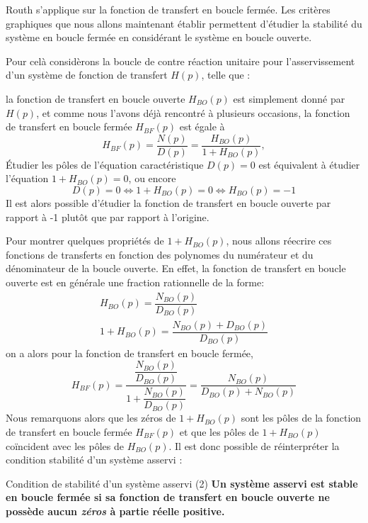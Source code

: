 Routh s'applique sur la fonction de transfert en boucle fermée. 
Les critères graphiques que nous allons maintenant établir 
permettent d'étudier la stabilité du système en boucle fermée en considérant 
le système en boucle ouverte.

Pour celà considèrons la boucle de contre réaction unitaire 
pour l'asservissement d'un système de fonction de transfert $H(p)$, telle que :
\begin{center}
    
\end{center}

la fonction de transfert en boucle ouverte $H_{BO}(p)$ est simplement donné 
par $H(p)$, et comme nous l'avons déjà rencontré à plusieurs occasions, la 
fonction de transfert en boucle fermée $H_{BF}(p)$ est égale à 
$$
H_{BF}(p)=\dfrac{N(p)}{D(p)}=\dfrac{H_{BO}(p)}{1+H_{BO}(p)},
$$
\'Etudier les pôles de l'équation caractéristique $D(p)=0$ est équivalent 
à étudier l'équation $1+H_{BO}(p)=0$, ou encore 
$$
D(p)=0\Leftrightarrow1+H_{BO}(p)=0\Leftrightarrow H_{BO}(p)=-1
$$
Il est alors possible d'étudier la fonction de transfert en boucle ouverte par 
rapport à -1 plutôt que par rapport à l'origine. 

Pour montrer quelques propriétés de $1+H_{BO}(p)$, nous allons réecrire
ces fonctions de transferts en fonction des polynomes du numérateur et
du dénominateur de la boucle ouverte.
En effet, la fonction de transfert en boucle ouverte
est en générale une fraction rationnelle de la forme:
\begin{align*}
H_{BO}(p)=\dfrac{N_{BO}(p)}{D_{BO}(p)} \\
1+H_{BO}(p)=\dfrac{N_{BO}(p)+D_{BO}(p)}{D_{BO}(p)}
\end{align*}
on a alors pour la fonction de transfert en boucle fermée, 
$$
H_{BF}(p)=\dfrac{\dfrac{N_{BO}(p)}{D_{BO}(p)}}{1+\dfrac{N_{BO}(p)}{D_{BO}(p)}}
         =\dfrac{N_{BO}(p)}{D_{BO}(p)+N_{BO}(p)}
$$
Nous remarquons alors que les zéros de $1+H_{BO}(p)$ 
sont les pôles de la fonction de transfert en boucle fermée 
$H_{BF}(p)$ et que les pôles de $1+H_{BO}(p)$ co\"incident avec 
les pôles de $H_{BO}(p)$. Il est donc possible de 
réinterpréter la condition stabilité d'un système asservi :

\begin{criteria}{Condition de stabilité d'un système asservi (2)}
    \textbf{Un système asservi est stable en boucle fermée si sa fonction 
    de transfert en boucle ouverte ne possède aucun \emph{zéros} à partie 
    réelle positive.}
\end{criteria}

